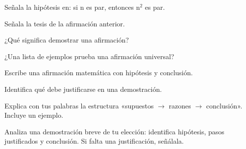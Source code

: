 \begin{activity}[id=dia-13-corta-01,type=short,weight=1]

Señala la hipótesis en: si n es par, entonces n\(^{2}\) es par.

\end{activity}

\begin{activity}[id=dia-13-corta-02,type=short,weight=1]

Señala la tesis de la afirmación anterior.

\end{activity}

\begin{activity}[id=dia-13-corta-03,type=short,weight=1]

¿Qué significa demostrar una afirmación?

\end{activity}

\begin{activity}[id=dia-13-corta-04,type=short,weight=1]

¿Una lista de ejemplos prueba una afirmación universal?

\end{activity}

\begin{activity}[id=dia-13-corta-05,type=short,weight=1]

Escribe una afirmación matemática con hipótesis y conclusión.

\end{activity}

\begin{activity}[id=dia-13-corta-06,type=short,weight=1]

Identifica qué debe justificarse en una demostración.

\end{activity}

\begin{activity}[id=dia-13-desarrollo-01,type=long,weight=2]

Explica con tus palabras la estructura «supuestos \(\to\) razones \(\to\) conclusión». Incluye un ejemplo.

\end{activity}

\begin{activity}[id=dia-13-desarrollo-02,type=long,weight=2]

Analiza una demostración breve de tu elección: identifica hipótesis, pasos justificados y conclusión. Si falta una justificación, señálala.

\end{activity}

